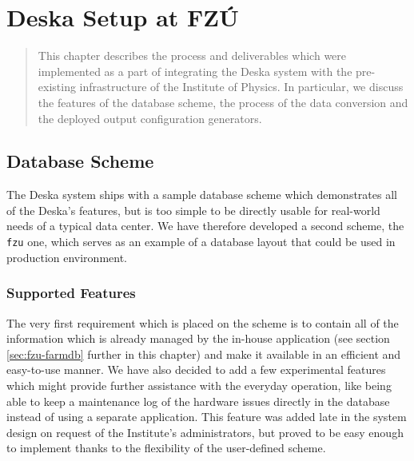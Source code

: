 \documentclass[deska]{subfiles}
\begin{document}
\chapter{Deska Setup at FZÚ}
\label{sec:fzu-setup}

\begin{abstract}
This chapter describes the process and deliverables which were implemented as a part of integrating the Deska system
with the pre-existing infrastructure of the Institute of Physics.  In particular, we discuss the features of the
database scheme, the process of the data conversion and the deployed output configuration generators.
\end{abstract}

\section{Database Scheme}
\label{sec:fzu-scheme}

The Deska system ships with a sample database scheme which demonstrates all of the Deska's features, but is too simple
to be directly usable for real-world needs of a typical data center.  We have therefore developed a second scheme, the
{\tt fzu} one, which serves as an example of a database layout that could be used in production environment.

\subsection{Supported Features}

The very first requirement which is placed on the scheme is to contain all of the information which is already managed
by the in-house application (see section \ref{sec:fzu-farmdb} further in this chapter) and make it available in an
efficient and easy-to-use manner.  We have also decided to add a few experimental features which might provide further
assistance with the everyday operation, like being able to keep a maintenance log of the hardware issues directly in the
database instead of using a separate application.  This feature was added late in the system design on request of the
Institute's administrators, but proved to be easy enough to implement thanks to the flexibility of the user-defined
scheme.
\end{document}

